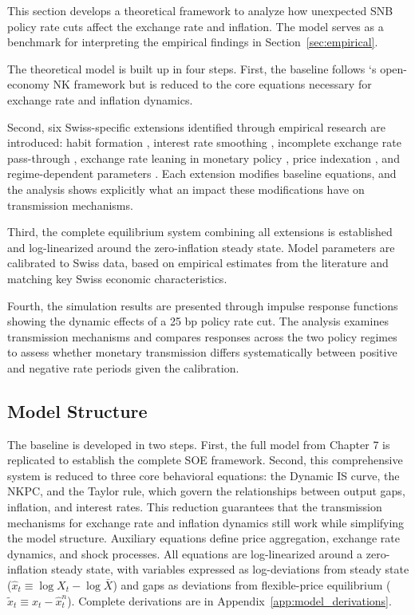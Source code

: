 \documentclass[12pt,a4paper]{article}
\begin{document}
This section develops a theoretical framework to analyze how unexpected SNB policy rate cuts affect the exchange rate and inflation. The model serves as a benchmark for interpreting the empirical findings in Section~\ref{sec:empirical}.

The theoretical model is built up in four steps. First, the baseline follows \citet{gali2008}`s open-economy NK framework but is reduced to the core equations necessary for exchange rate and inflation dynamics.

Second, six Swiss-specific extensions identified through empirical research are introduced: habit formation \citep{rudolf2014}, interest rate smoothing \citep{cuchecurti2009}, incomplete exchange rate pass-through \citep{cuchecurti2009}, exchange rate leaning in monetary policy \citep{cuchecurti2009}, price indexation \citep{gali2008}, and regime-dependent parameters \citep{baurle2014, baumann2025}. Each extension modifies baseline equations, and the analysis shows explicitly what an impact these modifications have on transmission mechanisms.

Third, the complete equilibrium system combining all extensions is established and log-linearized around the zero-inflation steady state. Model parameters are calibrated to Swiss data, based on empirical estimates from the literature and matching key Swiss economic characteristics. 

Fourth, the simulation results are presented through impulse response functions showing the dynamic effects of a 25 bp policy rate cut. The analysis examines transmission mechanisms and compares responses across the two policy regimes to assess whether monetary transmission differs systematically between positive and negative rate periods given the calibration.

\newpage

\subsection{Model Structure}
\label{subsec:model_structure}

The baseline is developed in two steps. First, the full model from \citet{gali2008} Chapter 7 is replicated to establish the complete SOE framework. Second, this comprehensive system is reduced to three core behavioral equations: the Dynamic IS curve, the NKPC, and the Taylor rule, which govern the relationships between output gaps, inflation, and interest rates. This reduction guarantees that the transmission mechanisms for exchange rate and inflation dynamics still work while simplifying the model structure. Auxiliary equations define price aggregation, exchange rate dynamics, and shock processes. All equations are log-linearized around a zero-inflation steady state, with variables expressed as log-deviations from steady state ($\widehat{x}_t \equiv \log X_t - \log \bar{X}$) and gaps as deviations from flexible-price equilibrium ($\tilde{x}_t \equiv \widehat{x}_t - \widehat{x}_t^n$). Complete derivations are in Appendix~\ref{app:model_derivations}.
\end{document}
